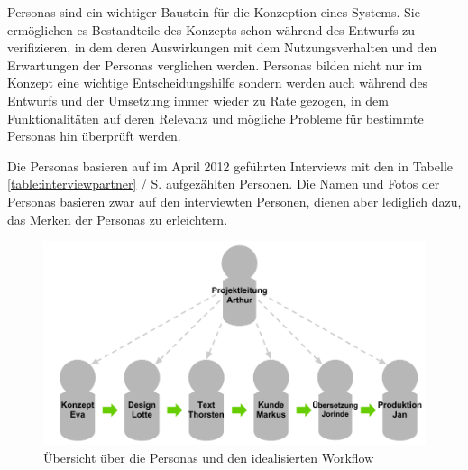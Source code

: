 Personas sind ein wichtiger Baustein für die Konzeption eines Systems. Sie ermöglichen es Bestandteile des Konzepts schon während des Entwurfs zu verifizieren, in dem deren Auswirkungen mit dem Nutzungsverhalten und den Erwartungen der Personas verglichen werden. Personas bilden nicht nur im Konzept eine wichtige Entscheidungshilfe sondern werden auch während des Entwurfs und der Umsetzung immer wieder zu Rate gezogen, in dem Funktionalitäten auf deren Relevanz und mögliche Probleme für bestimmte Personas hin überprüft werden. \cite[S.38 ff.]{cohn2004user}

Die Personas basieren auf im April 2012 geführten Interviews mit den in Tabelle \ref{table:interviewpartner} / S.\pageref{table:interviewpartner} aufgezählten Personen. Die Namen und Fotos der Personas basieren zwar auf den interviewten Personen, dienen aber lediglich dazu, das Merken der Personas zu erleichtern.

\begin{figure}[htb]
\begin{center}
\includegraphics[width=\textwidth]{media/Uebersicht-Personas.pdf}
\caption{Übersicht über die Personas und den idealisierten Workflow}
\label{chart:uebersicht-personas}
\end{center}
\end{figure}

